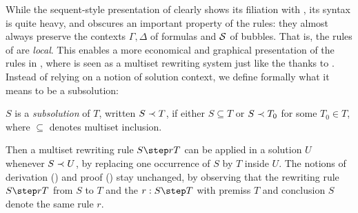 While the sequent-style presentation of  clearly shows its filiation
with , its syntax is quite heavy, and obscures an important
property of the rules: they almost always preserve the contexts $\Gamma, \Delta$
of formulas and $\mathcal{S}$ of bubbles. That is, the rules of  are
\emph{local}. This enables a more economical and graphical presentation of the
rules in , where  is seen as a multiset rewriting
system just like the {\cham} thanks to . Instead of relying on
a notion of solution context, we define formally what it means to be a
subsolution:

\begin{definition}[Subsolution]
  $S$ is a \emph{subsolution} of $T$, written $S \prec T$, if either $S
  \subseteq T$ or $S \prec T_0$ for some $T_0 \in T$, where $\subseteq$
  denotes multiset inclusion. 
\end{definition}

Then a multiset rewriting rule $\rrule{r}{S}{T}$ can be applied in a
solution $U$ whenever $S \prec U$, by replacing one occurrence of $S$ by $T$
inside $U$. The notions of derivation () and proof
() stay unchanged, by observing that the rewriting rule
$\rrule{r}{S}{T}$ from $S$ to $T$ and the 
$\irule{r}{S}{T}$ with premiss $T$ and conclusion $S$ denote the same
rule $r$.



